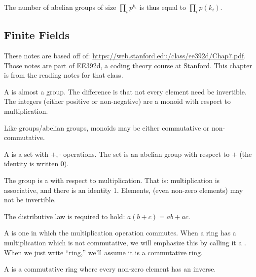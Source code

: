 \begin{remark}
  The number of abelian groups of size $\prod_i p^{k_i}$ is thus equal
  to $\prod_i p(k_i)$.
\end{remark}

\subsection{Finite Fields}

\begin{remark}
  These notes are based off of:
  \url{https://web.stanford.edu/class/ee392d/Chap7.pdf}. Those notes are
  part of EE392d, a coding theory course at Stanford. This chapter is
  from the reading notes for that class.
\end{remark}

\begin{definition}
  A  is almost a group. The difference is that not every
  element need be invertible. The integers (either positive or
  non-negative) are a monoid with respect to multiplication.

  Like groups/abelian groups, monoids may be either commutative or
  non-commutative.
\end{definition}

\begin{definition}
  A  is a set with $+, \cdot$ operations. The set is an
  abelian group with respect to $+$ (the identity is written 0).

  The group is a  with respect to multiplication. That
  is: multiplication is associative, and there is an identity 1.
  Elements, (even non-zero elements) may not be invertible.

  The distributive law is required to hold: $a(b + c) = ab + ac$.
\end{definition}

\begin{definition}
  A  is one in which the multiplication
  operation commutes. When a ring has a multiplication which is not
  commutative, we will emphasize this by calling it a
  . When we just write ``ring,'' we'll
  assume it is a commutative ring.
\end{definition}

\begin{definition}
  A  is a commutative ring where every non-zero element
  has an inverse.
\end{definition}

